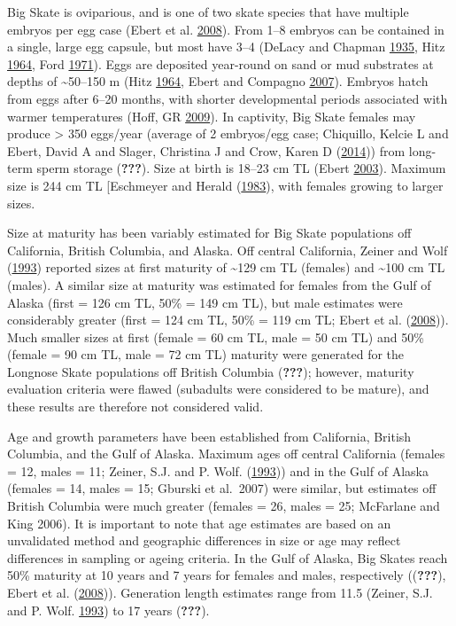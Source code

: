 \documentclass[12pt,]{article}
\begin{document}
Big Skate is oviparious, and is one of two skate species that have
multiple embryos per egg case (Ebert et al.
\protect\hyperlink{ref-Ebert2008}{2008}). From 1--8 embryos can be
contained in a single, large egg capsule, but most have 3--4 (DeLacy and
Chapman \protect\hyperlink{ref-DeLacy1935}{1935}, Hitz
\protect\hyperlink{ref-Hitz1964}{1964}, Ford
\protect\hyperlink{ref-Ford1971}{1971}). Eggs are deposited year-round
on sand or mud substrates at depths of \textasciitilde{}50--150 m (Hitz
\protect\hyperlink{ref-Hitz1964}{1964}, Ebert and Compagno
\protect\hyperlink{ref-Ebert2007}{2007}). Embryos hatch from eggs after
6--20 months, with shorter developmental periods associated with warmer
temperatures (Hoff, GR \protect\hyperlink{ref-Hoff2009}{2009}). In
captivity, Big Skate females may produce \textgreater{} 350 eggs/year
(average of 2 embryos/egg case; Chiquillo, Kelcie L and Ebert, David A
and Slager, Christina J and Crow, Karen D
(\protect\hyperlink{ref-Chiquillo2014}{2014})) from long-term sperm
storage ({\textbf{???}}). Size at birth is 18--23 cm TL (Ebert
\protect\hyperlink{ref-Ebert2003}{2003}). Maximum size is 244 cm TL
{[}Eschmeyer and Herald (\protect\hyperlink{ref-Eschmeyer1983}{1983}),
with females growing to larger sizes.

Size at maturity has been variably estimated for Big Skate populations
off California, British Columbia, and Alaska. Off central California,
Zeiner and Wolf (\protect\hyperlink{ref-ZeinerWolf1993}{1993}) reported
sizes at first maturity of \textasciitilde{}129 cm TL (females) and
\textasciitilde{}100 cm TL (males). A similar size at maturity was
estimated for females from the Gulf of Alaska (first = 126 cm TL, 50\% =
149 cm TL), but male estimates were considerably greater (first = 124 cm
TL, 50\% = 119 cm TL; Ebert et al.
(\protect\hyperlink{ref-Ebert2008}{2008})). Much smaller sizes at first
(female = 60 cm TL, male = 50 cm TL) and 50\% (female = 90 cm TL, male =
72 cm TL) maturity were generated for the Longnose Skate populations off
British Columbia ({\textbf{???}}); however, maturity evaluation criteria
were flawed (subadults were considered to be mature), and these results
are therefore not considered valid.

Age and growth parameters have been established from California, British
Columbia, and the Gulf of Alaska. Maximum ages off central California
(females = 12, males = 11; Zeiner, S.J. and P. Wolf.
(\protect\hyperlink{ref-ZeinerWolf1993}{1993})) and in the Gulf of
Alaska (females = 14, males = 15; Gburski et al.~2007) were similar, but
estimates off British Columbia were much greater (females = 26, males =
25; McFarlane and King 2006). It is important to note that age estimates
are based on an unvalidated method and geographic differences in size or
age may reflect differences in sampling or ageing criteria. In the Gulf
of Alaska, Big Skates reach 50\% maturity at 10 years and 7 years for
females and males, respectively (({\textbf{???}}), Ebert et al.
(\protect\hyperlink{ref-Ebert2008}{2008})). Generation length estimates
range from 11.5 (Zeiner, S.J. and P. Wolf.
\protect\hyperlink{ref-ZeinerWolf1993}{1993}) to 17 years
({\textbf{???}}).
\end{document}
